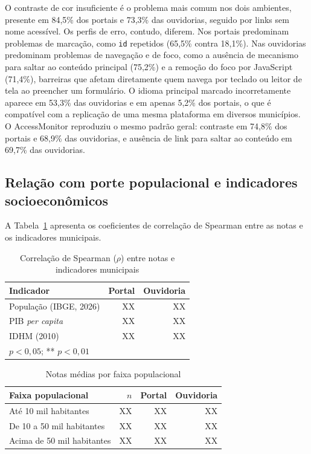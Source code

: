 \documentclass[12pt]{article}
\begin{document}
O contraste de cor insuficiente é o problema mais comum nos dois ambientes, presente em 84,5\% dos portais e 73,3\% das ouvidorias, seguido por links sem nome acessível. Os perfis de erro, contudo, diferem. Nos portais predominam problemas de marcação, como \texttt{id} repetidos (65,5\% contra 18,1\%). Nas ouvidorias predominam problemas de navegação e de foco, como a ausência de mecanismo para saltar ao conteúdo principal (75,2\%) e a remoção do foco por JavaScript (71,4\%), barreiras que afetam diretamente quem navega por teclado ou leitor de tela ao preencher um formulário. O idioma principal marcado incorretamente aparece em 53,3\% das ouvidorias e em apenas 5,2\% dos portais, o que é compatível com a replicação de uma mesma plataforma em diversos municípios. O AccessMonitor reproduziu o mesmo padrão geral: contraste em 74,8\% dos portais e 68,9\% das ouvidorias, e ausência de link para saltar ao conteúdo em 69,7\% das ouvidorias.

\subsection{Relação com porte populacional e indicadores socioeconômicos}

A Tabela~\ref{tab:correlacao} apresenta os coeficientes de correlação de
Spearman entre as notas e os indicadores municipais.
 
\begin{table}[H]
\centering
\caption{Correlação de Spearman ($\rho$) entre notas e indicadores municipais}
\label{tab:correlacao}
\begin{tabular}{lrr}
\toprule
\textbf{Indicador} & \textbf{Portal} & \textbf{Ouvidoria} \\
\midrule
População (IBGE, 2026)   & XX & XX \\
PIB \textit{per capita}  & XX & XX \\
IDHM (2010)              & XX & XX \\
\bottomrule
\multicolumn{3}{l}{\footnotesize * $p < 0{,}05$; ** $p < 0{,}01$}
\end{tabular}
\end{table}
 
\begin{table}[ht]
\centering
\caption{Notas médias por faixa populacional}
\label{tab:faixas}
\begin{tabular}{lrrr}
\toprule
\textbf{Faixa populacional} & \textbf{$n$} & \textbf{Portal} & \textbf{Ouvidoria} \\
\midrule
Até 10 mil habitantes      & XX & XX & XX \\
De 10 a 50 mil habitantes  & XX & XX & XX \\
Acima de 50 mil habitantes & XX & XX & XX \\
\bottomrule
\end{tabular}
\end{table}
 
\end{document}
